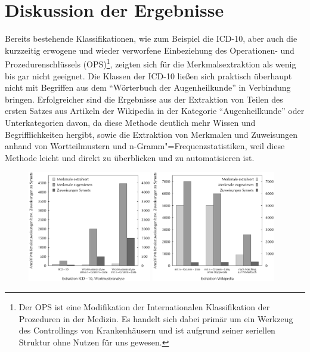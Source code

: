 \documentclass[pagesize,paper=A4,DIV=calc,fontsize=12pt,draft=false]{scrreprt}
\begin{document}
\section{Diskussion der Ergebnisse}

Bereits bestehende Klassifikationen, wie zum Beispiel die ICD-10, aber auch die kurzzeitig erwogene und wieder verworfene Einbeziehung des Operationen- und Prozedurenschlüssels (OPS)\footnote{Der OPS ist eine Modifikation der Internationalen Klassifikation der Prozeduren in der Medizin. Es handelt sich dabei primär um ein Werkzeug des Controllings von Krankenhäusern und ist aufgrund seiner seriellen Struktur ohne Nutzen für uns gewesen.}, zeigten sich für die Merkmalsextraktion als wenig bis gar nicht geeignet. 
Die Klassen der ICD-10 ließen sich praktisch überhaupt nicht mit Begriffen aus dem \enquote{Wörterbuch der Augenheilkunde} in Verbindung bringen. 
Erfolgreicher sind die Ergebnisse aus der Extraktion von Teilen des ersten Satzes aus Artikeln der Wikipedia in der Kategorie \enquote{Augenheilkunde} oder Unterkategorien davon, da diese Methode deutlich mehr Wissen und Begrifflichkeiten hergibt, sowie die Extraktion von Merkmalen und Zuweisungen anhand von Wortteilmustern und n-Gramm"=Frequenzstatistiken, weil diese Methode leicht und direkt zu überblicken und zu automatisieren ist. 

\begin{figure}[!ht]
\includegraphics[width=0.48\textwidth]{icd10_affixe.eps}
\hfill
\includegraphics[width=0.48\textwidth]{wiki_extraktion.eps}
\end{figure}
\end{document}
